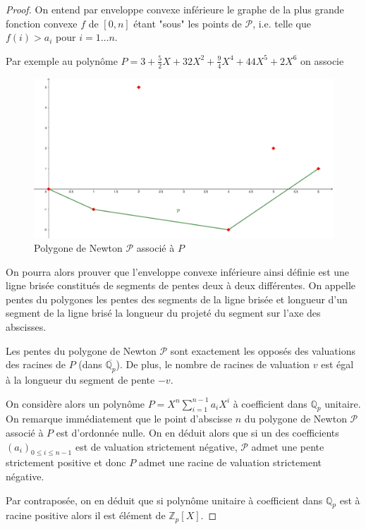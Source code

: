 \begin{proof}
On entend par enveloppe convexe inférieure le graphe de la plus grande fonction convexe $f$ de $[0,n]$ étant "sous" les points de  $\mathcal{P}$, i.e. telle que $f(i) > a_i$ pour $i=1\ldots n$.
 \begin{ex}
	 Par exemple au polynôme $P = 3 + \frac{5}{2} X+ 32 X^2+ \frac{9}{4} X^4+ 44 X^5 + 2 X^6$ on associe 
\begin{figure}[!ht]
      \centering
      \includegraphics[scale=0.25]{figures/polygone_newton.pdf}
      \caption{Polygone de Newton $\mathcal{P}$ associé à $P$}
      \label{poly_newton}
    \end{figure}
  \end{ex}

On pourra alors prouver que l'enveloppe convexe inférieure ainsi définie est une ligne brisée constitués de segments de pentes deux à deux différentes. On appelle pentes du polygones les pentes des segments de la ligne brisée et longueur d'un segment de la ligne brisé la longueur du projeté du segment sur l'axe des abscisses. 

\begin{theoreme}
Les pentes du polygone de Newton $\mathcal{P}$ sont exactement les opposés des valuations des racines de $P$ (dans $\overline{\mathbb{Q}_{p}}$). De plus, le nombre de racines de valuation $v$ est égal à la longueur du segment de pente $-v$.
\end{theoreme}

On considère alors un polynôme $P =X^n \sum_{i=1}^{n-1} a_{i}X^i$ à coefficient dans $\mathbb{Q}_p$ unitaire. On remarque immédiatement que le point d'abscisse $n$ du polygone de Newton $\mathcal{P}$ associé à $P$ est d'ordonnée nulle. On en déduit alors que si un des coefficients $(a_{i})_{0\le i\le n-1}$ est de valuation strictement négative, $\mathcal{P}$ admet une pente strictement positive et donc $P$ admet une racine de valuation strictement négative. 

Par contraposée, on en déduit que si polynôme unitaire à coefficient dans $\mathbb{Q}_{p} $ est à racine positive alors il est élément de $\mathbb{Z}_p[X]$.

\end{proof} 
